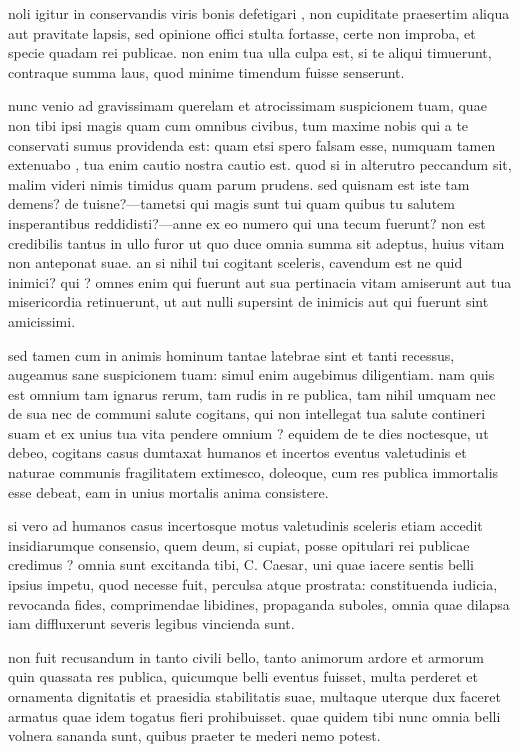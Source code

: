  noli igitur in conservandis viris bonis defetigari , non cupiditate praesertim aliqua aut pravitate lapsis, sed opinione offici stulta fortasse, certe non improba, et specie quadam rei publicae. non enim tua ulla culpa est, si te aliqui timuerunt, contraque summa laus, quod minime timendum fuisse senserunt.

 nunc venio ad gravissimam querelam et atrocissimam suspicionem tuam, quae non tibi ipsi magis quam cum omnibus civibus, tum maxime nobis qui a te conservati sumus providenda est: quam etsi spero falsam esse, numquam tamen extenuabo , tua enim cautio nostra cautio est. quod si in alterutro peccandum sit, malim videri nimis timidus quam parum prudens. sed quisnam est iste tam demens? de tuisne?—tametsi qui magis sunt tui quam quibus tu salutem insperantibus reddidisti?—anne ex eo numero qui una tecum fuerunt? non est credibilis tantus in ullo furor ut quo duce omnia summa sit adeptus, huius vitam non anteponat suae. an si nihil tui cogitant sceleris, cavendum est ne quid inimici? qui ? omnes enim qui fuerunt aut sua pertinacia vitam amiserunt aut tua misericordia retinuerunt, ut aut nulli supersint de inimicis aut qui fuerunt sint amicissimi.

 sed tamen cum in animis hominum tantae latebrae sint et tanti recessus, augeamus sane suspicionem tuam: simul enim augebimus diligentiam. nam quis est omnium tam ignarus rerum, tam rudis in re publica, tam nihil umquam nec de sua nec de communi salute cogitans, qui non intellegat tua salute contineri suam et ex unius tua vita pendere omnium ? equidem de te dies noctesque, ut debeo, cogitans casus dumtaxat humanos et incertos eventus valetudinis et naturae communis fragilitatem extimesco, doleoque, cum res publica immortalis esse debeat, eam in unius mortalis anima consistere.

 si vero ad humanos casus incertosque motus valetudinis sceleris etiam accedit insidiarumque consensio, quem deum, si cupiat, posse opitulari rei publicae credimus ? omnia sunt excitanda tibi, C. Caesar, uni quae iacere sentis belli ipsius impetu, quod necesse fuit, perculsa atque prostrata: constituenda iudicia, revocanda fides, comprimendae libidines, propaganda suboles, omnia quae dilapsa iam diffluxerunt severis legibus vincienda sunt.

 non fuit recusandum in tanto civili bello, tanto animorum ardore et armorum quin quassata res publica, quicumque belli eventus fuisset, multa perderet et ornamenta dignitatis et praesidia stabilitatis suae, multaque uterque dux faceret armatus quae idem togatus fieri prohibuisset. quae quidem tibi nunc omnia belli volnera sananda sunt, quibus praeter te mederi nemo potest.

